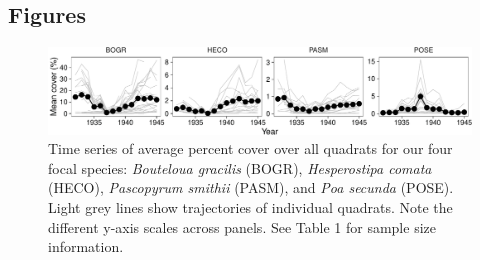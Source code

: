 \documentclass[12pt,]{article}
\begin{document}
\newpage{}

\subsection{Figures}\label{figures}

\begin{figure}[htbp]
\centering
\includegraphics{components/figure/manuscript-figure_1-1.pdf}
\caption{Time series of average percent cover over all quadrats for our
four focal species: \emph{Bouteloua gracilis} (BOGR), \emph{Hesperostipa
comata} (HECO), \emph{Pascopyrum smithii} (PASM), and \emph{Poa secunda}
(POSE). Light grey lines show trajectories of individual quadrats. Note
the different y-axis scales across panels. See Table 1 for sample size
information.}
\end{figure}

\newpage{}
\end{document}

